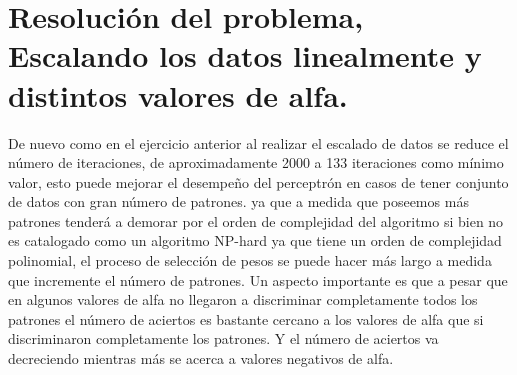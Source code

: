 \documentclass[8.5pt,twoside,twocolumn]{article}
\begin{document}
\section{ Resoluci\'on del problema, Escalando los datos linealmente y distintos valores de alfa.}
    De nuevo como en el ejercicio anterior al realizar el escalado de datos se reduce el n\'umero de 
iteraciones, de aproximadamente 2000 a 133 iteraciones como m\'inimo valor, esto puede mejorar el desempeño del perceptr\'on
en casos de tener conjunto de datos con gran n\'umero de patrones. ya que a medida que poseemos m\'as patrones tender\'a
a demorar por el orden de complejidad del algoritmo si bien no es catalogado como un algoritmo NP-hard ya que tiene un orden  de complejidad polinomial,
 el proceso de selecci\'on de pesos se puede hacer m\'as largo a medida que incremente el n\'umero de patrones.
 Un aspecto importante es que a pesar que en algunos valores de alfa no llegaron a discriminar completamente todos los patrones
el n\'umero de aciertos es bastante cercano a los valores de alfa que si discriminaron completamente los patrones.
Y el n\'umero de aciertos va decreciendo mientras m\'as se acerca a valores negativos de alfa.
\end{document}
